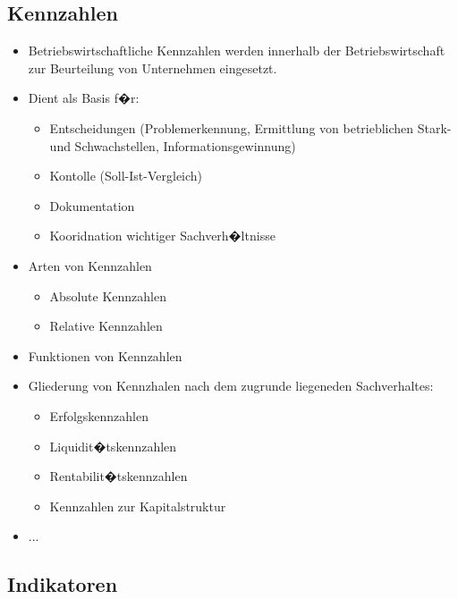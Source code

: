 \subsection{Kennzahlen}

\begin{itemize}
    \item Betriebswirtschaftliche Kennzahlen werden innerhalb der Betriebswirtschaft zur Beurteilung von Unternehmen eingesetzt.

    \item Dient als Basis f�r:
        \begin{itemize}
      	  	\item Entscheidungen (Problemerkennung, Ermittlung von betrieblichen Stark- und Schwachstellen, Informationsgewinnung) 
			\item Kontolle (Soll-Ist-Vergleich)
            \item Dokumentation
            \item Kooridnation wichtiger Sachverh�ltnisse
    	\end{itemize}

    \item Arten von Kennzahlen
    \begin{itemize}
        \item Absolute Kennzahlen
        \item Relative Kennzahlen
    \end{itemize}

    \item Funktionen von Kennzahlen
    \item Gliederung von Kennzhalen nach dem zugrunde liegeneden Sachverhaltes:
    \begin{itemize}
        \item Erfolgskennzahlen
        \item Liquidit�tskennzahlen
        \item Rentabilit�tskennzahlen
      	\item Kennzahlen zur Kapitalstruktur
    \end{itemize}
    \item ...
\end{itemize}






\subsection{Indikatoren}

